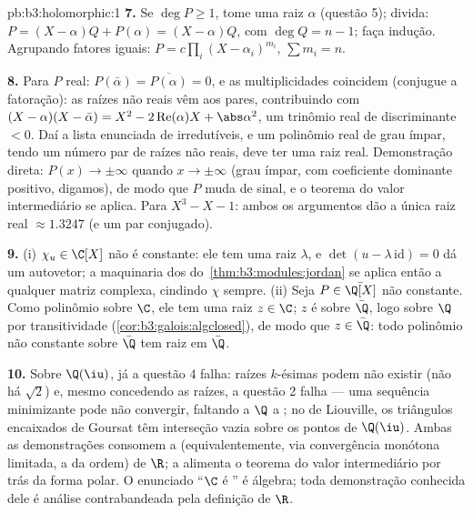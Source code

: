 \begin{solution}{pb:b3:holomorphic:1}
\textbf{7.} Se $\deg P \geq 1$, tome uma raiz $\alpha$
(questão 5); divida: $P = (X - \alpha)Q + P(\alpha) = (X -
\alpha)Q$, com $\deg Q = n - 1$; faça indução. Agrupando fatores
iguais: $P = c\prod_i(X - \alpha_i)^{m_i}$, $\sum m_i = n$.

\textbf{8.} Para $P$ real: $P(\bar\alpha) =
\overline{P(\alpha)} = 0$, e as multiplicidades coincidem
(conjugue a fatoração): as raízes não reais vêm aos pares,
contribuindo com $(X - \alpha)(X - \bar\alpha) = X^2 -
2\operatorname{Re}(\alpha)X + \abs\alpha^2$, um trinômio real
de discriminante $< 0$. Daí a lista enunciada de
irredutíveis, e um polinômio real de grau ímpar, tendo um
número par de raízes não reais, deve ter uma raiz real. Demonstração
direta: $P(x) \to \pm\infty$ quando $x \to \pm\infty$ (grau ímpar, com
coeficiente dominante positivo, digamos), de modo que $P$ muda de sinal, e
o teorema do valor intermediário se aplica. Para $X^3 - X - 1$:
ambos os argumentos dão a única raiz real $\approx 1.3247$
(e um par conjugado).

\textbf{9.} (i) $\chi_u \in \C[X]$ não é constante: ele tem uma
raiz $\lambda$, e $\det(u - \lambda\,\mathrm{id}) = 0$
dá um autovetor; a maquinaria dos  do~\cref{thm:b3:modules:jordan} se aplica então a qualquer matriz
complexa, cindindo $\chi$ sempre. (ii) Seja $P \in \bar\Q[X]$
não constante. Como polinômio sobre $\C$, ele tem uma raiz $z
\in \C$; $z$ é  sobre $\bar\Q$, logo sobre $\Q$ por
transitividade (\cref{cor:b3:galois:algclosed}), de modo que $z \in
\bar\Q$: todo polinômio não constante sobre $\bar\Q$ tem
raiz em $\bar\Q$.

\textbf{10.} Sobre $\Q(\iu)$, já a questão 4 falha:
raízes $k$-ésimas podem não existir (não há $\sqrt2$) e, mesmo concedendo
as raízes, a questão 2 falha --- uma sequência minimizante pode não
convergir, faltando a $\Q$ a ; no  de Liouville,
os triângulos  encaixados de Goursat têm interseção vazia
sobre os pontos de $\Q(\iu)$. Ambas as demonstrações consomem a 
(equivalentemente, via convergência monótona limitada, a
 da ordem) de $\R$; a  alimenta o
teorema do valor intermediário por trás da forma polar. O enunciado
``$\C$ é '' é álgebra; toda demonstração conhecida
dele é análise contrabandeada pela definição de
$\R$.


\end{solution}
